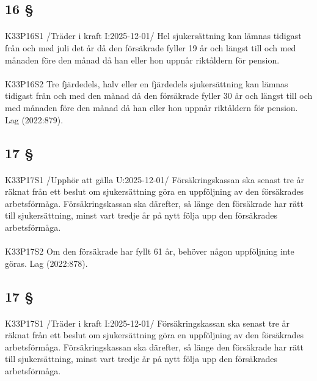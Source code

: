 \documentclass[a4paper,notitlepage,openany,10pt]{book}
\begin{document}
\subsection*{16 §}
\paragraph*{}
{\tiny K33P16S1}
/Träder i kraft I:2025-12-01/
Hel sjukersättning kan lämnas tidigast från och med juli det år då den försäkrade fyller 19 år och längst till och med månaden före den månad då han eller hon uppnår riktåldern för pension.
\paragraph*{}
{\tiny K33P16S2}
Tre fjärdedels, halv eller en fjärdedels sjukersättning kan lämnas tidigast från och med den månad då den försäkrade fyller 30 år och längst till och med månaden före den månad då han eller hon uppnår riktåldern för pension.
Lag (2022:879).
\subsection*{17 §}
\paragraph*{}
{\tiny K33P17S1}
/Upphör att gälla U:2025-12-01/
Försäkringskassan ska senast tre år räknat från ett beslut om sjukersättning göra en uppföljning av den försäkrades arbetsförmåga. Försäkringskassan ska därefter, så länge den försäkrade har rätt till sjukersättning, minst vart tredje år på nytt följa upp den försäkrades arbetsförmåga.
\paragraph*{}
{\tiny K33P17S2}
Om den försäkrade har fyllt 61 år, behöver någon uppföljning inte göras.
Lag (2022:878).
\subsection*{17 §}
\paragraph*{}
{\tiny K33P17S1}
/Träder i kraft I:2025-12-01/
Försäkringskassan ska senast tre år räknat från ett beslut om sjukersättning göra en uppföljning av den försäkrades arbetsförmåga. Försäkringskassan ska därefter, så länge den försäkrade har rätt till sjukersättning, minst vart tredje år på nytt följa upp den försäkrades arbetsförmåga.
\end{document}
